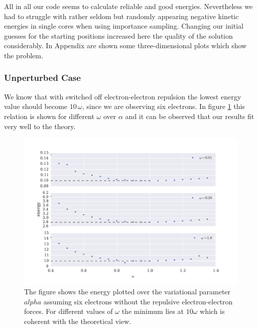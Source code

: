 All in all our code seems to calculate reliable and good energies. Nevertheless we had to struggle with rather seldom but randomly appearing negative kinetic energies in single cores when using importance sampling. Changing our initial guesses for the starting positions increased here the quality of the solution considerably. In Appendix  are shown some three-dimensional plots which show the problem. 

\subsubsection{Unperturbed Case}
We know that with switched off electron-electron repulsion the lowest energy value should become $10\,\omega$, since we are observing six electrons. In figure \ref{fig:six_electron_unperturbed} this relation is shown for different $\omega$ over $\alpha$ and it can be observed that our results fit very well to the theory. 
\begin{figure}[htbp]
    \centering
    \includegraphics[scale=0.7]{six_electron_unperturbed}
    \caption{The figure shows the energy plotted over the variational parameter $alpha$ assuming six electrons without the repulsive electron-electron forces. For different values of $\omega$ the minimum lies at $10\omega$ which is coherent with the theoretical view.}
    \label{fig:six_electron_unperturbed}
\end{figure}

